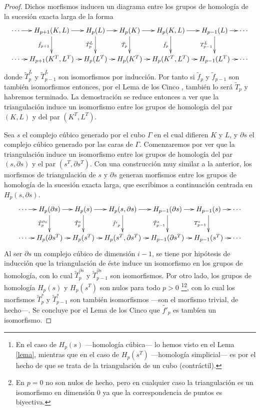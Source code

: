 \documentclass[12pt,a4paper,twoside]{article} %
\theoremstyle{plain}
\theoremstyle{definition}
\begin{document}
\begin{proof}
Dichos morfismos inducen un diagrama entre los grupos de homología de la sucesión exacta larga de la forma
\begin{equation*}
\xymatrix@C=0.8em{
\cdots \ar[r]  & H_{p+1}(K,L) \ar[r]\ar[d]_{\tilde{f}_{p+1}} & H_p(L) \ar[r]\ar[d]_{\tilde{T}_p^L} & H_p(K) \ar[r]\ar[d]_{\tilde{T}_p} & H_p(K,L) \ar[r] \ar[d]_{\tilde{f}_p} & H_{p-1}(L)\ar[d]_{T_{p-1}^{L}}\ar[r]  & \cdots \\
\cdots \ar[r]  & H_{p+1}(K^T,L^T) \ar[r]    & H_p(L^T) \ar[r]   & H_p(K^T) \ar[r]    & H_p(K^T,L^T) \ar[r] & H_{p-1}(L^T)\ar[r]  &\cdots
}
\end{equation*}
donde $\tilde{T}_p^L$ y $\tilde{T}_{p-1}^L$ son isomorfismos por inducción. Por tanto si $\tilde{f}_p$ y $\tilde{f}_{p-1}$ son también isomorfismos entonces, por el Lema de los Cinco \cite{Navarro}, también lo será $\tilde{T}_p$ y habremos terminado. La demostración se reduce entonces a ver que la triangulación induce un isomorfismo entre los grupos de homología del par $(K,L)$ y del par $(K^T,L^T)$.

Sea $s$ el complejo cúbico generado por el cubo $\Gamma$ en el cual difieren $K$ y $L$, y $\partial s$ el complejo cúbico generado por las caras de $\Gamma$. Comenzaremos por ver que la triangulación induce un isomorfismo entre los grupos de homología del par $(s, \partial s)$ y el par $(s^T, \partial s^T)$. Con una construcción muy similar a la anterior, los morfismos de triangulación de $s$ y $\partial s$ generan morfismos entre los grupos de homología de la sucesión exacta larga, que escribimos a continuación centrada en $H_p(s, \partial s)$.
\begin{equation*}
\xymatrix@C=0.8em{
\cdots \ar[r]  & H_{p}(\partial s) \ar[r]\ar[d]_{\tilde{T}_{p}^{\partial s}} & H_p(s) \ar[r]\ar[d]_{\tilde{T}_p^s} & H_p(s,\partial s) \ar[r]\ar[d]_{\tilde{f'}_p} & H_{p-1}(\partial s) \ar[r] \ar[d]_{\tilde{T}_{p-1}^{s}} & H_{p-1}(s)\ar[d]_{T_{p-1}^s}\ar[r]  & \cdots \\
\cdots \ar[r]  & H_{p}(\partial s^T) \ar[r] & H_p(s^T) \ar[r] & H_p(s^T,\partial s^T) \ar[r] & H_{p-1}(\partial s^T) \ar[r] & H_{p-1}(s^T) \ar[r]  & \cdots 
}
\end{equation*}
Al ser $\partial s$ un complejo cúbico de dimensión $i-1$, se tiene por hipótesis de inducción que la triangulación de éste induce un isomorfismo en los grupos de homología, con lo cual $\tilde{T}_p^{\partial s}$ y $\tilde{T}_{p-1}^{\partial s}$ son isomorfismos. Por otro lado, los grupos de homología $H_p(s)$ y $H_p(s^T)$ son nulos para todo $p>0$ \footnote{En el caso de $H_p(s)$ ---homología cúbica--- lo hemos visto en el Lema \ref{lema}, mientras que en el caso de $H_p(s^T)$ ---homología simplicial--- es por el hecho de que se trata de la triangulación de un cubo (contráctil).}\footnote{En $p=0$ no son nulos de hecho, pero en cualquier caso la triangulación es un isomorfismo en dimensión 0 ya que la correspondencia de puntos es biyectiva.}, con lo cual los morfismos $\tilde{T}_p^s$ y $\tilde{T}_{p-1}^s$ son también isomorfismos ---son el morfismo trivial, de hecho---. Se concluye por el Lema de los Cinco que $\tilde{f'}_p$ es tambíen un isomorfismo.


\end{proof}
\end{document}
